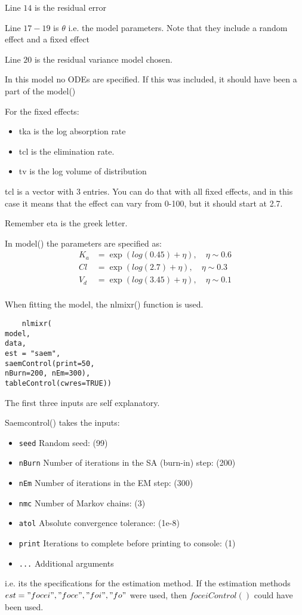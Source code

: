 Line $14$ is the residual error

Line $17-19$ is $\theta$ i.e. the model parameters. Note that they include a random effect and a fixed effect

Line $20$ is the residual variance model chosen. 

In this model no ODEs are specified. If this was included, it should have been a part of the model({})


For the fixed effects:
\begin{itemize}
    \item tka is the log absorption rate
    \item tcl is the elimination rate.
    \item tv is the log volume of distribution
\end{itemize}
tcl is a vector with $3$ entries. You can do that with all fixed effects, and in this case it means that the effect can vary from 0-100, but it should start at 2.7.

Remember eta is the greek letter.

In model({}) the parameters are specified as:
\begin{align*}
    K_{a}&=\exp(log(0.45)+\eta),  \quad \eta \sim 0.6\\
     Cl &= \exp(log(2.7) + \eta), \quad \eta \sim 0.3\\
    V_{d}&=\exp(log(3.45) + \eta), \quad \eta \sim 0.1\\
\end{align*}

When fitting the model, the nlmixr() function is used. 
\begin{lstlisting}
    nlmixr(
model,
data,
est = "saem",
saemControl(print=50,
nBurn=200, nEm=300),
tableControl(cwres=TRUE))
\end{lstlisting}
The first three inputs are self explanatory. 

Saemcontrol() takes the inputs: 
\begin{itemize}
  \item \texttt{seed} \hfill Random seed: (99)
  \item \texttt{nBurn} \hfill Number of iterations in the SA (burn-in) step: (200)
  \item \texttt{nEm} \hfill Number of iterations in the EM step: (300)
  \item \texttt{nmc} \hfill Number of Markov chains: (3)
  \item \texttt{atol} \hfill Absolute convergence tolerance: (1e-8)
  \item \texttt{print} \hfill Iterations to complete before printing to console: (1)
  \item \texttt{...} \hfill Additional arguments
\end{itemize}
i.e. its the specifications for the estimation method. If the estimation methods $est = "focei", "foce", "foi", "fo"$ were used, then $foceiControl()$ could have been used. 

